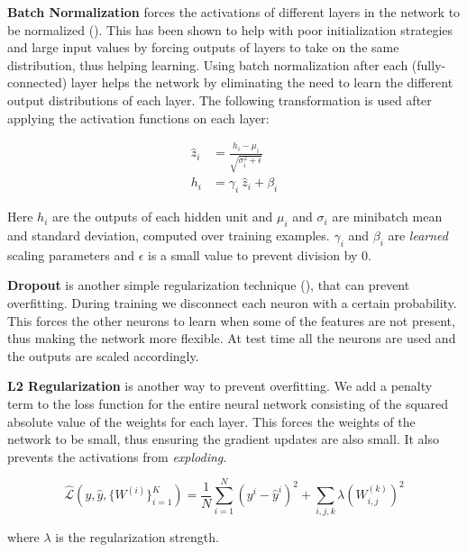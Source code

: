 \documentclass{article}
\newcommand{\citep}[2][]{(\cite[#1]{#2})}
\begin{document}
\textbf{Batch Normalization} forces the activations of different layers in the network to be normalized \citep{ioffe_batch_2015}. This has been shown to help with poor initialization strategies and large input values by forcing outputs of layers to take on the same distribution, thus helping learning. Using batch normalization after each (fully-connected) layer helps the network by eliminating the need to learn the different output distributions of each layer. The following transformation is used after applying the activation functions on each layer:

\begin{align}
    \hat{z}_i &= \frac{h_i - \mu_i}{\sqrt{\sigma_i^2 + \epsilon}} \\
    h_i &= \gamma_i\ \hat{z}_i + \beta_i
\end{align}

Here $h_i$ are the outputs of each hidden unit and $\mu_i$ and $\sigma_i$ are minibatch mean and standard deviation, computed over training examples. $\gamma_i$ and $\beta_i$ are \textit{learned} scaling parameters and $\epsilon$ is a small value to prevent division by 0.
\vskip 0.1in

\textbf{Dropout} is another simple regularization technique \citep{srivastava_dropout:_2014}, that can prevent overfitting. During training we disconnect each neuron with a certain probability. This forces the other neurons to learn when some of the features are not present, thus making the network more flexible. At test time all the neurons are used and the outputs are scaled accordingly.
\vskip 0.1in

\textbf{L2 Regularization} is another way to prevent overfitting. We add a penalty term to the loss function for the entire neural network consisting of the squared absolute value of the weights for each layer. This forces the weights of the network to be small, thus ensuring the gradient updates are also small. It also prevents the activations from \textit{exploding}.

\begin{equation}
    \mathcal{\hat{L}}(y, \hat{y}, \{W^{(i)}\}_{i = 1}^{K}) = \frac{1}{N} \sum_{i = 1}^{N} (y^{i} - \hat{y}^{i})^2 + \sum_{i,j,k} \lambda (W_{i,j}^{(k)})^2
\end{equation}

where $\lambda$ is the regularization strength.
\end{document}
